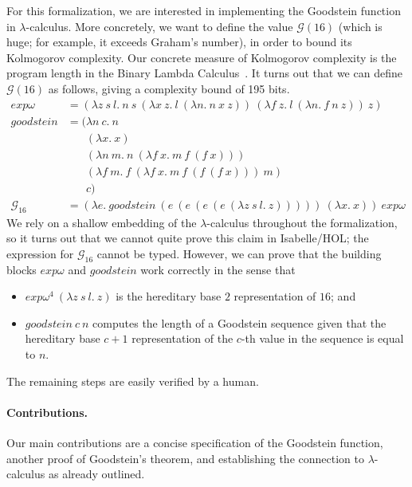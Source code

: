 \documentclass[11pt,a4paper]{article}
\begin{document}
For this formalization, we are interested in implementing the Goodstein
function in $\lambda$-calculus.
More concretely, we want to define the value $\mathcal G(16)$
(which is huge; for example, it exceeds Graham's number),
in order to bound its Kolmogorov complexity.
Our concrete measure of Kolmogorov complexity is the program length
in the Binary Lambda Calculus~\cite{BLC,T08}.
It turns out that we can define $\mathcal G(16)$ as follows,
giving a complexity bound of 195 bits.
\begin{align*}
\mathit{exp\omega} &=
(\lambda z\:s\:l.\:n\:s\:(\lambda x\:z.\:l\:(\lambda n.\:n\:x\:z))\:
(\lambda f\:z.\:l\:(\lambda n.\:f\:n\:z))\:z)\\
\mathit{goodstein} &= (\lambda n\:c.\:n\\
&\phantom{{}=(}(\lambda x.\:x)\\
&\phantom{{}=(}(\lambda n\:m.\:n\:(\lambda f\:x.\:m\:f\:(f\:x)))\\
&\phantom{{}=(}(\lambda f\:m.\:f\:(\lambda f\:x.\:m\:f\:(f\:(f\:x)))\:m)\\
&\phantom{{}=(}c)
\\
\mathcal G_{16} &=
(\lambda e.\:\mathit{goodstein}\:
(e\:(e\:(e\:(e\:(\lambda z\:s\:l.\:z)))))\:(\lambda x.\:x))\:
\mathit{exp\omega}
\end{align*}
We rely on a shallow embedding of the $\lambda$-calculus throughout
the formalization, so it turns out that we cannot quite prove this
claim in Isabelle/HOL; the expression for $\mathcal G_{16}$ cannot
be typed.
However, we can prove that the building blocks $\mathit{exp\omega}$
and $\mathit{goodstein}$ work correctly in the sense that
\begin{itemize}
\item $\mathit{exp\omega}^4\:(\lambda z\:s\:l.\:z)$
  is the hereditary base $2$ representation of $16$; and
\item $\mathit{goodstein}\:c\:n$ computes the length of a Goodstein
  sequence given that the hereditary base $c+1$ representation of
  the $c$-th value in the sequence is equal to $n$.
\end{itemize}
The remaining steps are easily verified by a human.

\paragraph{Contributions.}
Our main contributions are a concise specification of the Goodstein function,
another proof of Goodstein's theorem,
and establishing the connection to $\lambda$-calculus as already outlined.
\end{document}
